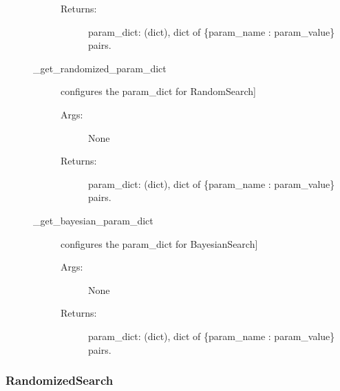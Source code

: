 \documentclass[letterpaper,10pt,english]{sphinxmanual}
\begin{document}
\begin{fulllineitems}
\begin{description}
\begin{description}
\begin{description}
\item[{Returns:}] \leavevmode
param\_dict: (dict), dict of \{param\_name : param\_value\} pairs.

\end{description}

\item[{\_get\_randomized\_param\_dict}] \leavevmode{[}configures the param\_dict for RandomSearch{]}\begin{description}
\item[{Args:}] \leavevmode
None

\item[{Returns:}] \leavevmode
param\_dict: (dict), dict of \{param\_name : param\_value\} pairs.

\end{description}

\item[{\_get\_bayesian\_param\_dict}] \leavevmode{[}configures the param\_dict for BayesianSearch{]}\begin{description}
\item[{Args:}] \leavevmode
None

\item[{Returns:}] \leavevmode
param\_dict: (dict), dict of \{param\_name : param\_value\} pairs.

\end{description}

\end{description}

\end{description}

\end{fulllineitems}



\subsubsection{RandomizedSearch}
\label{\detokenize{api/mastml.hyper_opt.RandomizedSearch:randomizedsearch}}\label{\detokenize{api/mastml.hyper_opt.RandomizedSearch::doc}}
\end{document}
